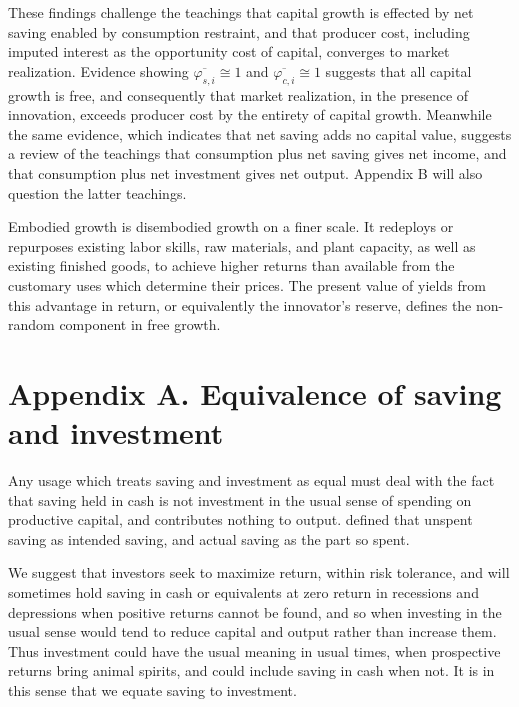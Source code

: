 \documentclass[a4paper,fleqn]{latex_styles/cas-sc}
\begin{document}
These findings challenge the teachings that capital growth is effected
by net saving enabled by consumption restraint, and that producer
cost, including imputed interest as the opportunity cost of capital,
converges to market realization. Evidence showing \(\overline{\varphi_{s,i}} \cong 1\)
and \(\overline{\varphi_{c,i}} \cong 1\) suggests that all capital growth is free, and
consequently that market realization, in the presence of innovation,
exceeds producer cost by the entirety of capital growth. Meanwhile the same evidence, which indicates that net saving adds no capital value, suggests a review of the teachings that consumption plus net saving gives net income, and that consumption plus net investment gives net output. Appendix B will also question the latter teachings.

Embodied growth is disembodied growth on a finer scale. It redeploys or
repurposes existing labor skills, raw materials, and plant capacity, as
well as existing finished goods, to achieve higher returns than
available from the customary uses which determine their prices. The
present value of yields from this advantage in return, or equivalently
the innovator's reserve, defines the non-random component in free growth.

\appendix
\renewcommand{\theequation}{A.\arabic{equation}}
\setcounter{equation}{0}

\hypertarget{appendix-a}{
\section*{Appendix A. \hspace{0.5em}Equivalence of saving and investment}\label{appendix-a}
}

Any usage which treats saving and investment as equal must deal with the fact that saving held in cash is not investment in the usual sense of spending on productive capital, and contributes nothing to output. \cite{keynesGeneralTheoryEmployment1936} defined that unspent saving as intended saving, and actual saving as the part so spent.

We suggest that investors seek to maximize return, within risk tolerance, and will sometimes hold saving in cash or equivalents at zero return in recessions and depressions when positive returns cannot be found, and so when investing in the usual sense would tend to reduce capital and output rather than increase them. Thus investment could have the usual meaning in usual times, when prospective returns bring animal spirits, and could include saving in cash when not. It is in this sense that we equate saving to investment.
\end{document}
